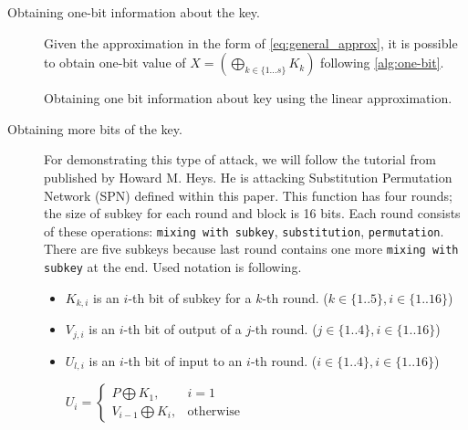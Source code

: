 \documentclass[
    digital,    %
    oneside,    %
    color,
    11pt,
    nocover,
    notable,
    nolof,
    nolot,
    final
]{fithesis3}
\renewcommand\_{\textunderscore\allowbreak}
\begin{document}
\begin{description}
	\item[Obtaining one-bit information about the key.] Given the approximation in the form of \cref{eq:general_approx}, it is possible to obtain one-bit value of $X = \left( \bigoplus_{k \in \{1...s\}} K_{k} \right)$ following \cref{alg:one-bit}. \cite{junod2000linear}
	
	\begin{algorithm}[H]

		
		\caption{Obtaining one bit information about key using the linear approximation.} 
		\label{alg:one-bit}
	\end{algorithm}
	
	\item[Obtaining more bits of the key.] For demonstrating this type of attack, we will follow the tutorial from \cite{human-cryptanalysis} published by Howard M. Heys. He is attacking Substitution Permutation Network (SPN) defined within this paper. This function has four rounds; the size of subkey for each round and block is 16 bits. Each round consists of these operations: \texttt{mixing with subkey}, \texttt{substitution}, \texttt{permutation}. There are five subkeys because last round contains one more \texttt{mixing with subkey} at the end. Used notation is following.
	
	\begin{itemize}
		\item $K_{k,i}$ is an $i$-th bit of subkey for a $k$-th round. ($k \in \{1..5\}, i \in \{1..16\}$)
		\item $V_{j,i}$ is an $i$-th bit of output of a $j$-th round. ($j \in \{1..4\}, i \in \{1..16\}$)
		\item $U_{l,i}$ is an $i$-th bit of input to an $i$-th round. ($i \in \{1..4\}, i \in \{1..16\}$)
		
		$U_{i} = \begin{cases}
		P \bigoplus K_{1}, & i = 1 \\
		V_{i-1} \bigoplus K_{i}, & \text{otherwise}
		\end{cases}
		$
	\end{itemize}


\end{description}
\end{document}
